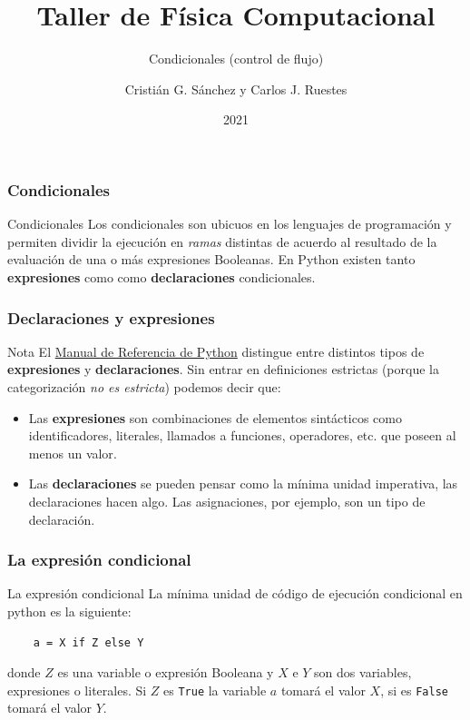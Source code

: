 \documentclass{beamer}
\title{Taller de Física Computacional}
\subtitle{Condicionales (control de flujo)}
\author{Cristián G. Sánchez y Carlos J. Ruestes}
\date{2021}
\begin{document}
\frame{\titlepage}

\begin{frame}[fragile]
    \frametitle{Condicionales}
    \begin{block}{Condicionales}
    Los condicionales son ubicuos en los lenguajes de programación y permiten dividir la ejecución en {\em ramas} distintas
    de acuerdo al resultado de la evaluación de una o más expresiones Booleanas. En Python existen tanto {\bf expresiones} como 
    como {\bf declaraciones} condicionales.
    \end{block}  
    \end{frame}

\begin{frame}[fragile]
    \frametitle{Declaraciones y expresiones}
    \begin{block}{Nota}
        El \href{https://docs.python.org/3/reference/index.html}{Manual de Referencia de Python} distingue entre distintos tipos de {\bf expresiones}
        y {\bf declaraciones}. Sin entrar en definiciones estrictas (porque la categorización {\em no es estricta}) podemos decir que:
        \begin{itemize}
            \item Las {\bf expresiones} son combinaciones de elementos sintácticos como identificadores, literales, llamados a funciones,
            operadores, etc. que poseen al menos un \alert{valor}.
            \item Las {\bf declaraciones} se pueden pensar como la mínima unidad imperativa, las declaraciones \alert{hacen algo}. Las asignaciones,
            por ejemplo, son un tipo de declaración. 
        \end{itemize}
    \end{block}    
    \end{frame}
    
\begin{frame}[fragile]
    \frametitle{La expresión condicional}
    \begin{block}{La expresión condicional}
    La mínima unidad de código de ejecución condicional en python es la siguiente:
    \begin{verbatim}
    a = X if Z else Y
    \end{verbatim}
    donde $Z$ es una variable o expresión Booleana y $X$ e $Y$ son dos variables, expresiones o literales. 
    Si $Z$ es \texttt{True} la variable $a$ tomará el valor $X$, si es \texttt{False} 
    tomará el valor $Y$.
    \end{block}
    \end{frame}
\end{document}
